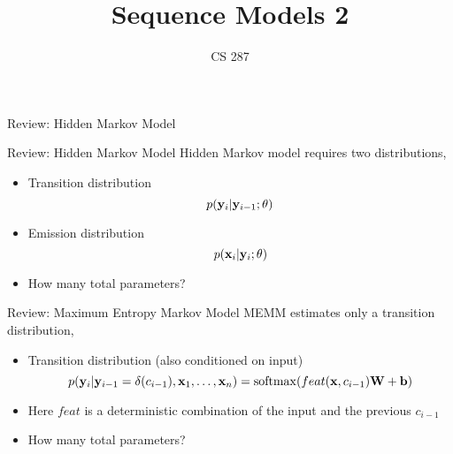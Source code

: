 \documentclass{beamer}
\title{Sequence Models 2}
\date{}
\author{CS 287}
\begin{document}
\begin{frame}
  \titlepage
\end{frame}



\begin{frame}{Review: Hidden Markov Model}
\begin{center}  
\end{center}  
\end{frame}


\begin{frame}{Review: Hidden Markov Model}
  Hidden Markov model requires two distributions,
  \begin{itemize}
  \item Transition distribution 
    \[p(\mathbf{y}_i | \mathbf{y}_{i-1}; \theta)\]
  \item Emission distribution
    \[ p(\mathbf{x}_i | \mathbf{y}_i ; \theta)\] 
  \end{itemize}


  \begin{itemize}
  \item How many total parameters?
  \end{itemize}
\end{frame}


\begin{frame}{Review: Maximum Entropy Markov Model}
  MEMM estimates only a transition distribution,
  \begin{itemize}
  \item Transition distribution (also conditioned on input)
    \[p(\boldy_i | \boldy_{i-1}=\delta(c_{i-1}), \boldx_1, \ldots, \boldx_n) = \softmax(feat(\boldx, c_{i-1}) \boldW + \boldb) \]

  \item Here $feat$ is a deterministic combination of the input and the previous $c_{i-1}$   
  \end{itemize}
  \begin{itemize}
  \item How many total parameters?
  \end{itemize}
\end{frame}
\end{document}
